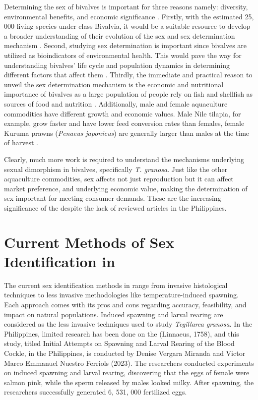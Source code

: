 Determining the sex of bivalves is important for three reasons namely: diversity, environmental benefits, and economic significance \cite{breton2010novel}. Firstly, with the estimated 25, 000 living species under class Bivalvia, it would be a suitable resource to develop a broader understanding of their evolution of the sex and sex determination mechanism  \cite{breton2010novel}. Second, studying sex determination is important since bivalves are utilized as bioindicators of environmental health. This would pave the way for understanding bivalves' life cycle and population dynamics in determining different factors that affect them \cite{campos2012}. Thirdly, the immediate and practical reason to unveil the sex determination mechanism is the economic and nutritional importance of bivalves as a large population of people rely on fish and shellfish as sources of food and nutrition \cite{naylor2000}. Additionally, male and female aquaculture commodities have different growth and economic values. Male Nile tilapia, for example, grow faster and have lower feed conversion rates than females, female Kuruma prawns (\textit{Penaeus japonicus}) are generally larger than males at the time of harvest \cite{budd}. 

Clearly, much more work is required to understand the mechanisms underlying sexual dimorphism in bivalves, specifically \textit{T. granosa}. Just like the other aquaculture commodities, sex affects not just reproduction but it can affect market preference, and underlying economic value, making the determination of sex important for meeting consumer demands. These are the increasing significance of the \Tgranosa despite the lack of reviewed articles in the Philippines.

\section{Current Methods of Sex Identification in \Tegillarcagranosa}

The current sex identification methods in \Tegillarcagranosa range from invasive histological techniques to less invasive methodologies like temperature-induced spawning. Each approach comes with its pros and cons regarding accuracy, feasibility, and impact on natural populations.
Induced spawning and larval rearing are considered as the less invasive techniques used to study \textit{Tegillarca granosa}. In the Philippines, limited research has been done on the \Tegillarcagranosa (Linnaeus, 1758), and this study, titled Initial Attempts on Spawning and Larval Rearing of the Blood Cockle, \Tegillarcagranosa in the Philippines, is conducted by Denise Vergara Miranda and Victor Marco Emmanuel Nuestro Ferriols (2023). The researchers conducted experiments on induced spawning and larval rearing, discovering that the eggs of female \Tgranosa were salmon pink, while the sperm released by males looked milky. After spawning, the researchers successfully generated 6, 531, 000 fertilized eggs.

